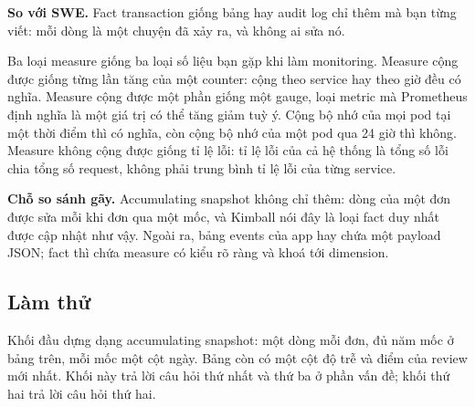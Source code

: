 \begin{ghichu}
\textbf{So với SWE.} Fact transaction giống bảng  hay audit log chỉ thêm mà bạn từng viết: mỗi dòng là một chuyện đã xảy ra, và không ai sửa nó.

Ba loại measure giống ba loại số liệu bạn gặp khi làm monitoring. Measure cộng được giống từng lần tăng của một counter: cộng theo service hay theo giờ đều có nghĩa. Measure cộng được một phần giống một gauge, loại metric mà Prometheus định nghĩa là một giá trị có thể tăng giảm tuỳ ý. Cộng bộ nhớ của mọi pod tại một thời điểm thì có nghĩa, còn cộng bộ nhớ của một pod qua 24 giờ thì không. Measure không cộng được giống tỉ lệ lỗi: tỉ lệ lỗi của cả hệ thống là tổng số lỗi chia tổng số request, không phải trung bình tỉ lệ lỗi của từng service.

\textbf{Chỗ so sánh gãy.} Accumulating snapshot không chỉ thêm: dòng của một đơn được sửa mỗi khi đơn qua một mốc, và Kimball nói đây là loại fact duy nhất được cập nhật như vậy. Ngoài ra, bảng events của app hay chứa một payload JSON; fact thì chứa measure có kiểu rõ ràng và khoá tới dimension.
\end{ghichu}

\subsection{Làm thử}

Khối đầu dựng  dạng accumulating snapshot: một dòng mỗi đơn, đủ năm mốc ở bảng trên, mỗi mốc một cột ngày. Bảng còn có một cột độ trễ và điểm của review mới nhất. Khối này trả lời câu hỏi thứ nhất và thứ ba ở phần vấn đề; khối thứ hai trả lời câu hỏi thứ hai.

